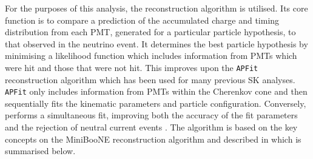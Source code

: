 For the purposes of this analysis, the \fq reconstruction algorithm is utilised. Its core function is to compare a prediction of the accumulated charge and timing distribution from each PMT, generated for a particular particle hypothesis, to that observed in the neutrino event. It determines the best particle hypothesis by minimising a likelihood function which includes information from PMTs which were hit and those that were not hit. This improves upon the \texttt{APFit} reconstruction algorithm which has been used for many previous SK analyses. \texttt{APFit} only includes information from PMTs within the \quickmath{43\deg} Cherenkov cone and then sequentially fits the kinematic parameters and particle configuration. Conversely, \fq performs a simultaneous fit, improving both the accuracy of the fit parameters and the rejection of neutral current  events . The \fq algorithm is based on the key concepts on the MiniBooNE reconstruction algorithm  and described in  which is summarised below.

